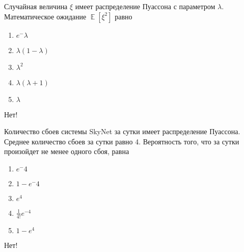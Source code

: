 \documentclass[t]{beamer}
\DeclareMathOperator{\E}{\mathbb{E}}
\begin{document}
 \begin{frame} \label{27-No} 
\begin{block}{27} 

Случайная величина $\xi$ имеет распределение Пуассона с параметром $\lambda$. Математическое ожидание $\E[\xi^2]$ равно
  


 \end{block} 
\begin{enumerate} 
\item[] \hyperlink{27-No}{\beamergotobutton{} $e^-\lambda$}
\item[] \hyperlink{27-No}{\beamergotobutton{} $\lambda(1 - \lambda)$}
\item[] \hyperlink{27-No}{\beamergotobutton{} $\lambda^2$}
\item[] \hyperlink{27-Yes}{\beamergotobutton{} $\lambda(\lambda+1)$}
\item[] \hyperlink{27-No}{\beamergotobutton{} $\lambda$}
\end{enumerate} 

 \alert{Нет!} 
\end{frame} 


 \begin{frame} \label{28-No} 
\begin{block}{28} 

Количество сбоев системы SkyNet за сутки имеет распределение Пуассона. Среднее количество сбоев за сутки равно 4. Вероятность того, что за сутки произойдет не менее одного сбоя, равна
  


 \end{block} 
\begin{enumerate} 
\item[] \hyperlink{28-No}{\beamergotobutton{}  $e^-4$ }
\item[] \hyperlink{28-Yes}{\beamergotobutton{}  $1- e^-4$ }
\item[] \hyperlink{28-No}{\beamergotobutton{}  $e^4$ }
\item[] \hyperlink{28-No}{\beamergotobutton{}  $\tfrac{1}{4!}e^{-4}$}
\item[] \hyperlink{28-No}{\beamergotobutton{}  $1-e^4$ }
\end{enumerate} 

 \alert{Нет!} 
\end{frame} 
\end{document}
